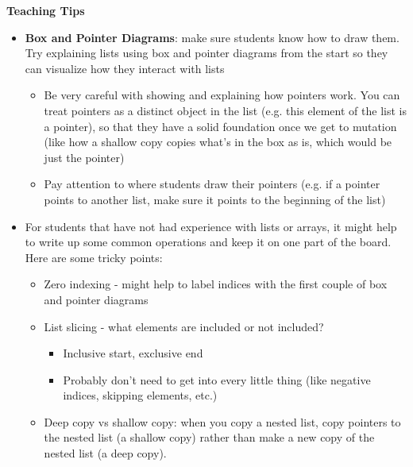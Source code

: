 \begin{blocksection}
	\begin{guide}
	\textbf{Teaching Tips}
	\begin{itemize}
			\item \textbf{Box and Pointer Diagrams}: make sure students know how to draw them. Try explaining lists using box and pointer diagrams from the start so they can visualize how they interact with lists
			\begin{itemize}
				\item Be very careful with showing and explaining how pointers work. You can treat pointers as a distinct object in the list (e.g. this element of the list is a pointer), so that they have a solid foundation once we get to mutation (like how a shallow copy copies what’s in the box as is, which would be just the pointer)
				\item Pay attention to where students draw their pointers (e.g. if a pointer points to another list, make sure it points to the beginning of the list)
			\end{itemize}
			\item For students that have not had experience with lists or arrays, it might help to write up some common operations and keep it on one part of the board. Here are some tricky points:
			\begin{itemize}
				\item Zero indexing - might help to label indices with the first couple of box and pointer diagrams
				\item List slicing - what elements are included or not included?
				\begin{itemize}
					\item Inclusive start, exclusive end
					\item Probably don’t need to get into every little thing (like negative indices, skipping elements, etc.)
				\end{itemize}
				\item Deep copy vs shallow copy: when you copy a nested list, copy pointers to the nested list (a shallow copy) rather than make a new copy of the nested list (a deep copy).
			\end{itemize}
	\end{itemize}
	\end{guide}
\end{blocksection}
